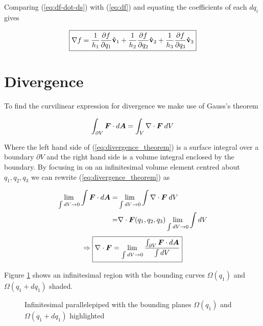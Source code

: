\documentclass[twoside, a4paper]{article}
\begin{document}
Comparing (\ref{eq:df-dot-ds}) with (\ref{eq:df}) and equating the coefficients of each $dq_i$ gives

\begin{equation}
\label{eq:grad_f}
\boxed{
\nabla f = \frac{1}{h_1} \frac{\partial f}{\partial q_1} \mathbf{\hat{v}}_1 + \frac{1}{h_2} \frac{\partial f}{\partial q_2} \mathbf{\hat{v}}_2 + \frac{1}{h_3} \frac{\partial f}{\partial q_3} \mathbf{\hat{v}}_3
}
\end{equation}

\section{Divergence}
To find the curvilinear expression for divergence we make use of Gauss's theorem

\begin{equation}
\label{eq:divergence_theorem}
\int_{\partial V} \mbox{\boldmath$ F $} \cdot d\mbox{\boldmath$ A $} = \int_{V} \nabla \cdot \mbox{\boldmath$ F $} \: dV
\end{equation}

Where the left hand side of (\ref{eq:divergence_theorem}) is a surface integral over a boundary $\partial V$ and the right hand side is a volume integral enclosed by the boundary. By focusing in on an infinitesimal volume element centred about $q_1,q_2,q_3$ we can rewrite (\ref{eq:divergence_theorem}) as

\begin{align*}
\lim_{\int dV \to 0} \int \mbox{\boldmath$ F $} \cdot d\mbox{\boldmath$ A $} = &
\lim_{\int dV \to 0} \int \nabla \cdot \mbox{\boldmath$ F $} \: dV \\
= & \nabla \cdot \mbox{\boldmath$ F $}(q_1,q_2,q_3) \lim_{\int dV \to 0} \int dV \\
\end{align*}
\begin{equation}
\label{eq:divergence_theorem_limit}
\Rightarrow 
\boxed{
\displaystyle \nabla \cdot \mbox{\boldmath$ F $} = \lim_{\int dV \to 0}\frac{ \int_{\partial V} \mbox{\boldmath$ F $} \cdot d\mbox{\boldmath$ A $} }{ \int dV }
}
\end{equation}

Figure \ref{fig:divergence} shows an infinitesimal region with the bounding curves $\Omega(q_1)$ and $\Omega(q_1+dq_1)$ shaded.

\begin{figure}[htbp]
	\centering
	\caption{Infinitesimal parallelepiped with the bounding planes $\Omega(q_1)$ and \mbox{$\Omega(q_1+dq_1)$} highlighted}
	\label{fig:divergence}
\end{figure}
\end{document}
